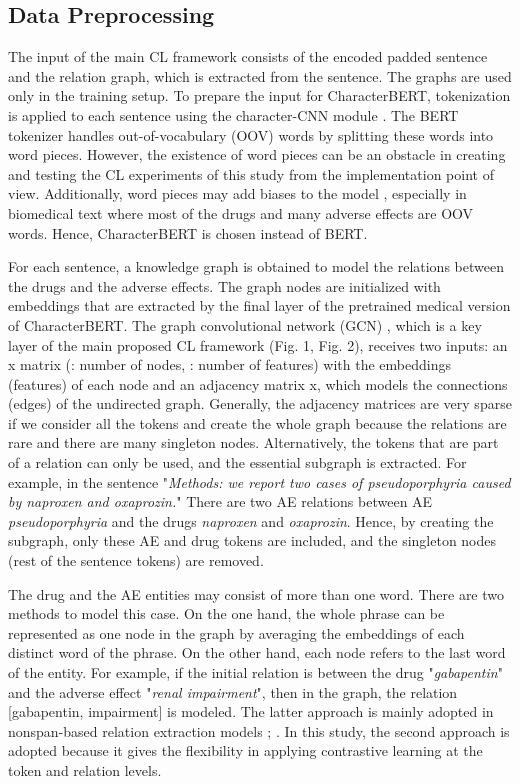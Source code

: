 \documentclass[11pt]{article}
\begin{document}
\subsection{Data Preprocessing}
The input of the main CL framework consists of the encoded padded sentence and the relation graph, which is extracted from the sentence. The graphs are used only in the training setup. To prepare the input for CharacterBERT, tokenization is applied to each sentence using the character-CNN module \cite{peters2018deep}. The BERT tokenizer handles out-of-vocabulary (OOV) words by splitting these words into word pieces. However, the existence of word pieces can be an obstacle in creating and testing the CL experiments of this study from the implementation point of view. Additionally, word pieces may add biases to the model \cite{el2020characterbert}, especially in biomedical text where most of the drugs and many adverse effects are OOV words. Hence, CharacterBERT is chosen instead of BERT.

\par
For each sentence, a knowledge graph is obtained to model the relations between the drugs and the adverse effects. The graph nodes are initialized with embeddings that are extracted by the final layer of the pretrained medical version of CharacterBERT. The graph convolutional network (GCN) \cite{kipf2016semi}, which is a key layer of the main proposed CL framework (Fig. 1, Fig. 2), receives two inputs: an x matrix (: number of nodes, : number of features) with the embeddings (features) of each node and an adjacency matrix x, which models the connections (edges) of the undirected graph. Generally, the adjacency matrices are very sparse if we consider all the tokens and create the whole graph because the relations are rare and there are many singleton nodes. Alternatively, the tokens that are part of a relation can only be used, and the essential subgraph is extracted. For example, in the sentence "\textit{Methods: we report two cases of pseudoporphyria caused by naproxen and oxaprozin.}" There are two AE relations between AE \textit{pseudoporphyria} and the drugs \textit{naproxen} and \textit{oxaprozin}. Hence, by creating the subgraph, only these AE and drug tokens are included, and the singleton nodes (rest of the sentence tokens) are removed.

\par
The drug and the AE entities may consist of more than one word. There are two methods to model this case. On the one hand, the whole phrase can be represented as one node in the graph by averaging the embeddings of each distinct word of the phrase. On the other hand, each node refers to the last word of the entity. For example, if the initial relation is between the drug "\textit{gabapentin}" and the adverse effect "\textit{renal impairment}", then in the graph, the relation [gabapentin, impairment] is modeled. The latter approach is mainly adopted in nonspan-based relation extraction models \cite{bekoulis2018joint}; \cite{zhaomodeling}. In this study, the second approach is adopted because it gives the flexibility in applying contrastive learning at the token and relation levels.
\end{document}
